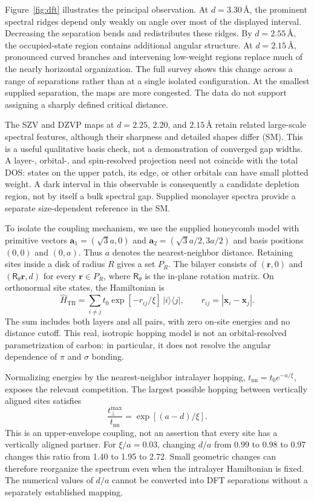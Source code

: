 \documentclass[aps,prl,reprint,superscriptaddress,longbibliography]{revtex4-2}
\newcommand{\angstrom}{\text{\AA}}
\begin{document}
Figure~\ref{fig:dft} illustrates the principal observation. At $d=3.30\,\angstrom$, the prominent spectral ridges depend only weakly on angle over most of the displayed interval. Decreasing the separation bends and redistributes these ridges. By $d=2.55\,\angstrom$, the occupied-state region contains additional angular structure. At $d=2.15\,\angstrom$, pronounced curved branches and intervening low-weight regions replace much of the nearly horizontal organization. The full survey shows this change across a range of separations rather than at a single isolated configuration. At the smallest supplied separation, the maps are more congested. The data do not support assigning a sharply defined critical distance.

The SZV and DZVP maps at $d=2.25$, $2.20$, and $2.15\,\angstrom$ retain related large-scale spectral features, although their sharpness and detailed shapes differ (SM). This is a useful qualitative basis check, not a demonstration of converged gap widths. A layer-, orbital-, and spin-resolved projection need not coincide with the total DOS: states on the upper patch, its edge, or other orbitals can have small plotted weight. A dark interval in this observable is consequently a candidate depletion region, not by itself a bulk spectral gap. Supplied monolayer spectra provide a separate size-dependent reference in the SM.

To isolate the coupling mechanism, we use the supplied honeycomb model with primitive vectors
$\bm a_1=(\sqrt{3}a,0)$ and $\bm a_2=(\sqrt{3}a/2,3a/2)$ and basis positions $(0,0)$ and $(0,a)$. Thus $a$ denotes the nearest-neighbor distance. Retaining sites inside a disk of radius $R$ gives a set $P_R$. The bilayer consists of $(\bm r,0)$ and $(\mathsf R_\theta\bm r,d)$ for every $\bm r\in P_R$, where $\mathsf R_\theta$ is the in-plane rotation matrix. On orthonormal site states, the Hamiltonian is
\begin{equation}
 \hat H_{\mathrm{TB}}=
 \sum_{i\ne j}t_0\exp[-r_{ij}/\xi]\,|i\rangle\langle j|,
 \qquad r_{ij}=|\bm x_i-\bm x_j|.
 \label{eq:tb}
\end{equation}
The sum includes both layers and all pairs, with zero on-site energies and no distance cutoff. This real, isotropic hopping model is not an orbital-resolved parametrization of carbon: in particular, it does not resolve the angular dependence of $\pi$ and $\sigma$ bonding.

Normalizing energies by the nearest-neighbor intralayer hopping,
$t_{\mathrm{nn}}=t_0e^{-a/\xi}$, exposes the relevant competition. The largest possible hopping between vertically aligned sites satisfies
\begin{equation}
 \frac{t_{\perp}^{\max}}{t_{\mathrm{nn}}}
 =\exp[(a-d)/\xi].
 \label{eq:ratio}
\end{equation}
This is an upper-envelope coupling, not an assertion that every site has a vertically aligned partner. For $\xi/a=0.03$, changing $d/a$ from 0.99 to 0.98 to 0.97 changes this ratio from 1.40 to 1.95 to 2.72. Small geometric changes can therefore reorganize the spectrum even when the intralayer Hamiltonian is fixed. The numerical values of $d/a$ cannot be converted into DFT separations without a separately established mapping.
\end{document}
